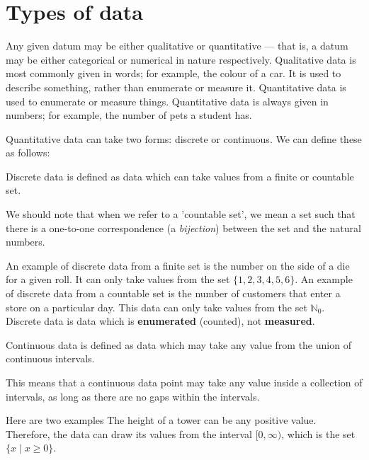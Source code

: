 \section{Types of data}

Any given datum may be either qualitative or quantitative — that is, a datum may be either categorical or numerical in nature respectively.
Qualitative data is most commonly given in words; for example, the colour of a car. It is used to describe something, rather than enumerate or measure it.
Quantitative data is used to enumerate or measure things. Quantitative data is always given in numbers; for example, the number of pets a student has.

Quantitative data can take two forms: discrete or continuous. We can define these as follows:

\begin{tcolorbox}
    \begin{definition}
        Discrete data is defined as data which can take values from a finite or countable set.
    \end{definition}
    \tcblower
    We should note that when we refer to a 'countable set', we mean a set such that there is a one-to-one correspondence (a \textit{bijection}) between the set and the natural numbers.
\end{tcolorbox}

An example of discrete data from a finite set is the number on the side of a die for a given roll. It can only take values from the set $\{ 1,2,3,4,5,6 \}$.
An example of discrete data from a countable set is the number of customers that enter a store on a particular day. This data can only take values from the set $\mathbb{N}_0$.
Discrete data is data which is \textbf{enumerated} (counted), not \textbf{measured}.

\begin{tcolorbox}
    \begin{definition}
        Continuous data is defined as data which may take any value from the union of continuous intervals.
    \end{definition}
    \tcblower
    This means that a continuous data point may take any value inside a collection of intervals, as long as there are no gaps within the intervals.
\end{tcolorbox}
Here are two examples 
The height of a tower can be any positive value. Therefore, the data can draw its values from the interval $[0, \infty)$, which is the set $\{ x \mid x \geq 0 \}$.

